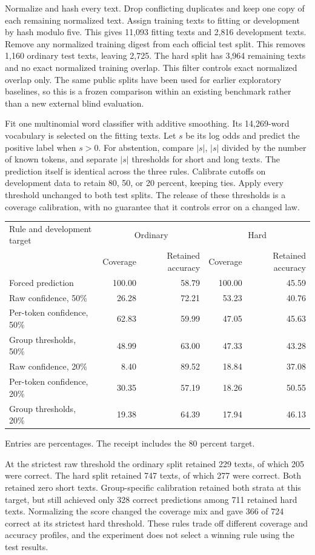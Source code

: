 \documentclass[11pt]{article}
\begin{document}
Normalize and hash every text. Drop conflicting duplicates and
keep one copy of each remaining normalized text. Assign training
texts to fitting or development by hash modulo five. This gives
11,093 fitting texts and 2,816 development texts. Remove any
normalized training digest from each official test split. This
removes 1,160 ordinary test texts, leaving 2,725. The hard split
has 3,964 remaining texts and no exact normalized training
overlap. This filter controls exact normalized overlap only.
The same public splits have been used for earlier exploratory
baselines, so this is a frozen comparison within an existing
benchmark rather than a new external blind evaluation.

Fit one multinomial word classifier with additive smoothing.
Its 14,269-word vocabulary is selected on the fitting texts.
Let $s$ be its log odds and predict the positive label when
$s>0$. For abstention, compare $|s|$, $|s|$ divided by the
number of known tokens, and separate $|s|$ thresholds for
short and long texts. The prediction itself is identical
across the three rules. Calibrate cutoffs on development data
to retain 80, 50, or 20 percent, keeping ties. Apply every
threshold unchanged to both test splits. The release of these
thresholds is a coverage calibration, with no guarantee that
it controls error on a changed law.

\begin{center}
\small
\begin{tabular}{lrrrr}
\toprule
Rule and development target & \multicolumn{2}{c}{Ordinary} & \multicolumn{2}{c}{Hard} \\
 & Coverage & Retained accuracy & Coverage & Retained accuracy \\
\midrule
Forced prediction & 100.00 & 58.79 & 100.00 & 45.59 \\
Raw confidence, 50\% & 26.28 & 72.21 & 53.23 & 40.76 \\
Per-token confidence, 50\% & 62.83 & 59.99 & 47.05 & 45.63 \\
Group thresholds, 50\% & 48.99 & 63.00 & 47.33 & 43.28 \\
Raw confidence, 20\% & 8.40 & 89.52 & 18.84 & 37.08 \\
Per-token confidence, 20\% & 30.35 & 57.19 & 18.26 & 50.55 \\
Group thresholds, 20\% & 19.38 & 64.39 & 17.94 & 46.13 \\
\bottomrule
\end{tabular}

\medskip
\footnotesize Entries are percentages. The receipt includes the 80 percent target.
\end{center}
At the strictest raw threshold the ordinary split retained 229
texts, of which 205 were correct. The hard split retained 747
texts, of which 277 were correct. Both retained zero short
texts. Group-specific calibration retained both strata at this
target, but still achieved only 328 correct predictions among
711 retained hard texts. Normalizing the score changed the
coverage mix and gave 366 of 724 correct at its strictest
hard threshold. These rules trade off different coverage and
accuracy profiles, and the experiment does not select a winning
rule using the test results.
\end{document}
